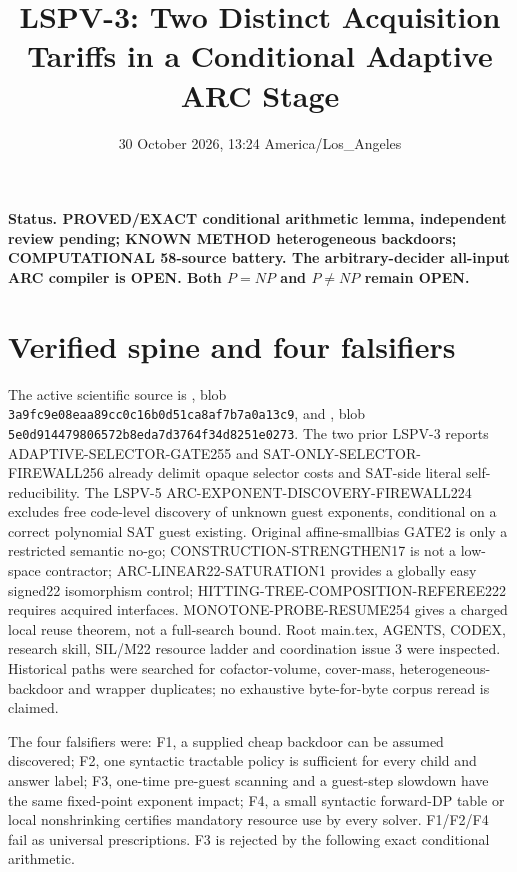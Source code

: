 \documentclass[11pt]{article}
\title{LSPV-3: Two Distinct Acquisition Tariffs in a Conditional Adaptive ARC Stage}
\date{30 October 2026, 13:24 America/Los\_Angeles}
\begin{document}
\maketitle

\noindent\textbf{Status. PROVED/EXACT conditional arithmetic lemma, independent review pending; KNOWN METHOD heterogeneous backdoors; COMPUTATIONAL 58-source battery. The arbitrary-decider all-input ARC compiler is OPEN. Both $P=NP$ and $P\ne NP$ remain OPEN.}

\section{Verified spine and four falsifiers}
The active scientific source is , blob \texttt{3a9fc9e08eaa89cc0c16b0d51ca8af7b7a0a13c9}, and , blob \texttt{5e0d914479806572b8eda7d3764f34d8251e0273}. The two prior LSPV-3 reports ADAPTIVE-SELECTOR-GATE255 and SAT-ONLY-SELECTOR-FIREWALL256 already delimit opaque selector costs and SAT-side literal self-reducibility. The LSPV-5 ARC-EXPONENT-DISCOVERY-FIREWALL224 excludes free code-level discovery of unknown guest exponents, conditional on a correct polynomial SAT guest existing. Original affine-smallbias GATE2 is only a restricted semantic no-go; CONSTRUCTION-STRENGTHEN17 is not a low-space contractor; ARC-LINEAR22-SATURATION1 provides a globally easy signed22 isomorphism control; HITTING-TREE-COMPOSITION-REFEREE222 requires acquired interfaces. MONOTONE-PROBE-RESUME254 gives a charged local reuse theorem, not a full-search bound. Root main.tex, AGENTS, CODEX, research skill, SIL/M22 resource ladder and coordination issue 3 were inspected. Historical paths were searched for cofactor-volume, cover-mass, heterogeneous-backdoor and wrapper duplicates; no exhaustive byte-for-byte corpus reread is claimed.

The four falsifiers were: F1, a supplied cheap backdoor can be assumed discovered; F2, one syntactic tractable policy is sufficient for every child and answer label; F3, one-time pre-guest scanning and a guest-step slowdown have the same fixed-point exponent impact; F4, a small syntactic forward-DP table or local nonshrinking certifies mandatory resource use by every solver. F1/F2/F4 fail as universal prescriptions. F3 is rejected by the following exact conditional arithmetic.
\end{document}
